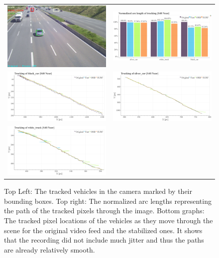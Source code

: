 \begin{figure}[!ht]
  \centering
  \begin{tabular}{cc}
    \includegraphics[width=0.45\linewidth]{diagrams/object_tracking/s40_n_near/frame.png}    &  
    \includegraphics[width=0.475\linewidth]{diagrams/object_tracking/s40_n_near/normalized_arc_lengths.html.png}    \\

    \includegraphics[width=0.475\linewidth]{diagrams/object_tracking/s40_n_near/black_car.png}    &  
    \includegraphics[width=0.475\linewidth]{diagrams/object_tracking/s40_n_near/silver_car.png}    \\  
    \includegraphics[width=0.475\linewidth]{diagrams/object_tracking/s40_n_near/white_truck.png}   
  \end{tabular}
  \caption{Top Left:
  The tracked vehicles in the camera  marked by their bounding boxes. 
  Top right: 
  The normalized arc lengths representing the path of the tracked pixels through the image.
  Bottom graphs:
  The tracked pixel locations of the vehicles as they move through the scene for the original video feed and the stabilized ones.
  It shows that the recording did not include much jitter and thus the paths are already relatively smooth.
   }
  \label{fig:object_tracking_appendix_s40_n_near}
\end{figure}



